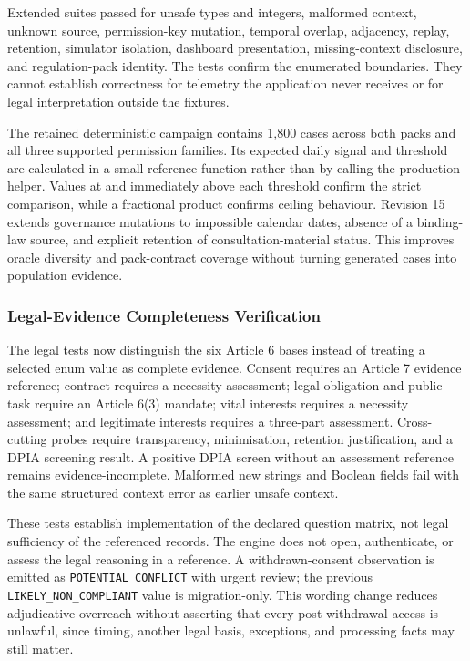 Extended suites passed for unsafe types and integers, malformed context, unknown source, permission-key mutation, temporal overlap, adjacency, replay, retention, simulator isolation, dashboard presentation, missing-context disclosure, and regulation-pack identity. The tests confirm the enumerated boundaries. They cannot establish correctness for telemetry the application never receives or for legal interpretation outside the fixtures.

The retained deterministic campaign contains 1,800 cases across both packs and all three supported permission families. Its expected daily signal and threshold are calculated in a small reference function rather than by calling the production helper. Values at and immediately above each threshold confirm the strict comparison, while a fractional product confirms ceiling behaviour. Revision 15 extends governance mutations to impossible calendar dates, absence of a binding-law source, and explicit retention of consultation-material status. This improves oracle diversity and pack-contract coverage without turning generated cases into population evidence.

\subsubsection{Legal-Evidence Completeness Verification}

The legal tests now distinguish the six Article 6 bases instead of treating a selected enum value as complete evidence. Consent requires an Article 7 evidence reference; contract requires a necessity assessment; legal obligation and public task require an Article 6(3) mandate; vital interests requires a necessity assessment; and legitimate interests requires a three-part assessment. Cross-cutting probes require transparency, minimisation, retention justification, and a DPIA screening result. A positive DPIA screen without an assessment reference remains evidence-incomplete. Malformed new strings and Boolean fields fail with the same structured context error as earlier unsafe context.

These tests establish implementation of the declared question matrix, not legal sufficiency of the referenced records. The engine does not open, authenticate, or assess the legal reasoning in a reference. A withdrawn-consent observation is emitted as \texttt{POTENTIAL\_CONFLICT} with urgent review; the previous \texttt{LIKELY\_NON\_COMPLIANT} value is migration-only. This wording change reduces adjudicative overreach without asserting that every post-withdrawal access is unlawful, since timing, another legal basis, exceptions, and processing facts may still matter.

